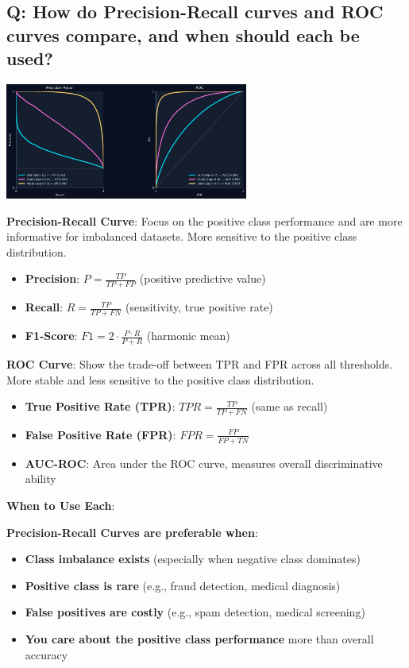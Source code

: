 \subsection*{\textcolor{primaryteal}{Q: How do Precision-Recall curves and ROC curves compare, and when should each be used?}}
\begin{center}
	\includegraphics[width=0.6\textwidth]{images/pr_roc.png}
\end{center}

\textbf{Precision-Recall Curve}:
Focus on the positive class performance and are more informative for imbalanced datasets. More sensitive to the positive class distribution.
\begin{itemize}
	\item \textbf{Precision}: $P = \frac{TP}{TP + FP}$ (positive predictive value)
	\item \textbf{Recall}: $R = \frac{TP}{TP + FN}$ (sensitivity, true positive rate)
	\item \textbf{F1-Score}: $F1 = 2 \cdot \frac{P \cdot R}{P + R}$ (harmonic mean)
\end{itemize}

\textbf{ROC Curve}:
Show the trade-off between TPR and FPR across all thresholds. More stable and less sensitive to the positive class distribution.
\begin{itemize}
	\item \textbf{True Positive Rate (TPR)}: $TPR = \frac{TP}{TP + FN}$ (same as recall)
	\item \textbf{False Positive Rate (FPR)}: $FPR = \frac{FP}{FP + TN}$
	\item \textbf{AUC-ROC}: Area under the ROC curve, measures overall discriminative ability
\end{itemize}

\textbf{When to Use Each}:

\textbf{Precision-Recall Curves are preferable when}:
\begin{itemize}
	\item \textbf{Class imbalance exists} (especially when negative class dominates)
	\item \textbf{Positive class is rare} (e.g., fraud detection, medical diagnosis)
	\item \textbf{False positives are costly} (e.g., spam detection, medical screening)
	\item \textbf{You care about the positive class performance} more than overall accuracy
\end{itemize}

